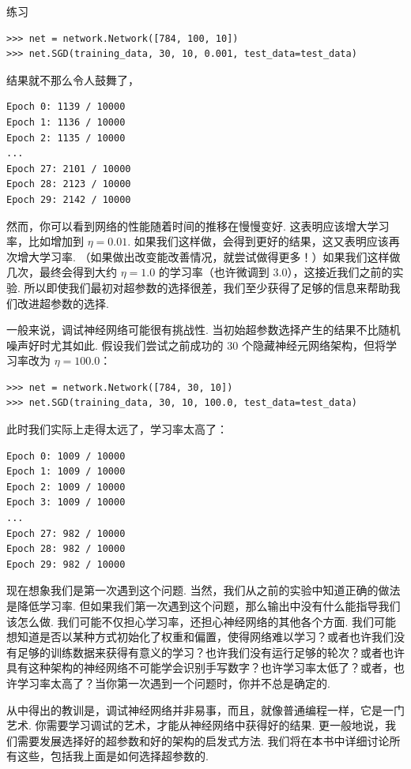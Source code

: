 \begin{exerciseBox}{练习}
\begin{lstlisting}
>>> net = network.Network([784, 100, 10])
>>> net.SGD(training_data, 30, 10, 0.001, test_data=test_data)

\end{lstlisting}

结果就不那么令人鼓舞了，

\begin{lstlisting}
Epoch 0: 1139 / 10000
Epoch 1: 1136 / 10000
Epoch 2: 1135 / 10000
...
Epoch 27: 2101 / 10000
Epoch 28: 2123 / 10000
Epoch 29: 2142 / 10000

\end{lstlisting}

然而，你可以看到网络的性能随着时间的推移在慢慢变好. 这表明应该增大学习率，比如增加到 $\eta = 0.01$. 如果我们这样做，会得到更好的结果，这又表明应该再次增大学习率. （如果做出改变能改善情况，就尝试做得更多！）如果我们这样做几次，最终会得到大约 $\eta = 1.0$ 的学习率（也许微调到 $3.0$），这接近我们之前的实验. 所以即使我们最初对超参数的选择很差，我们至少获得了足够的信息来帮助我们改进超参数的选择.

一般来说，调试神经网络可能很有挑战性. 当初始超参数选择产生的结果不比随机噪声好时尤其如此. 假设我们尝试之前成功的 30 个隐藏神经元网络架构，但将学习率改为 $\eta = 100.0$：

\begin{lstlisting}
>>> net = network.Network([784, 30, 10])
>>> net.SGD(training_data, 30, 10, 100.0, test_data=test_data)

\end{lstlisting}

此时我们实际上走得太远了，学习率太高了：

\begin{lstlisting}
Epoch 0: 1009 / 10000
Epoch 1: 1009 / 10000
Epoch 2: 1009 / 10000
Epoch 3: 1009 / 10000
...
Epoch 27: 982 / 10000
Epoch 28: 982 / 10000
Epoch 29: 982 / 10000

\end{lstlisting}

现在想象我们是第一次遇到这个问题. 当然，我们从之前的实验中知道正确的做法是降低学习率. 但如果我们第一次遇到这个问题，那么输出中没有什么能指导我们该怎么做. 我们可能不仅担心学习率，还担心神经网络的其他各个方面. 我们可能想知道是否以某种方式初始化了权重和偏置，使得网络难以学习？或者也许我们没有足够的训练数据来获得有意义的学习？也许我们没有运行足够的轮次？或者也许具有这种架构的神经网络不可能学会识别手写数字？也许学习率太低了？或者，也许学习率太高了？当你第一次遇到一个问题时，你并不总是确定的.

从中得出的教训是，调试神经网络并非易事，而且，就像普通编程一样，它是一门艺术. 你需要学习调试的艺术，才能从神经网络中获得好的结果. 更一般地说，我们需要发展选择好的超参数和好的架构的启发式方法. 我们将在本书中详细讨论所有这些，包括我上面是如何选择超参数的.

\end{exerciseBox}
